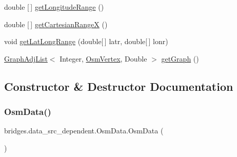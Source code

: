 \begin{DoxyCompactItemize}
double \mbox{[}$\,$\mbox{]} \hyperlink{classbridges_1_1data__src__dependent_1_1_osm_data_a4a30fc62901cd0cea50d2e4a266c6c05}{get\+Longitude\+Range} ()
\item 
double \mbox{[}$\,$\mbox{]} \hyperlink{classbridges_1_1data__src__dependent_1_1_osm_data_aa8a436daa0df5d64bc24f45b371872c5}{get\+Cartesian\+RangeX} ()
\item 
void \hyperlink{classbridges_1_1data__src__dependent_1_1_osm_data_a2f80de5c73dd1bf72378e6a0573ba663}{get\+Lat\+Long\+Range} (double\mbox{[}$\,$\mbox{]} latr, double\mbox{[}$\,$\mbox{]} lonr)
\item 
\hyperlink{classbridges_1_1base_1_1_graph_adj_list}{Graph\+Adj\+List}$<$ Integer, \hyperlink{classbridges_1_1data__src__dependent_1_1_osm_vertex}{Osm\+Vertex}, Double $>$ \hyperlink{classbridges_1_1data__src__dependent_1_1_osm_data_a4f5282b7b11ef6e4a248a05c35fe3787}{get\+Graph} ()
\end{DoxyCompactItemize}


\subsection{Constructor \& Destructor Documentation}
\mbox{\label{classbridges_1_1data__src__dependent_1_1_osm_data_a1ba678dfedee33772a620d678f7a04d8}} 
\subsubsection{\texorpdfstring{Osm\+Data()}{OsmData()}\hspace{0.1cm}{\footnotesize\ttfamily [1/2]}}
{\footnotesize\ttfamily bridges.\+data\+\_\+src\+\_\+dependent.\+Osm\+Data.\+Osm\+Data (\begin{DoxyParamCaption}{ }\end{DoxyParamCaption})}

\mbox{\label{classbridges_1_1data__src__dependent_1_1_osm_data_a822667d3269b059bf14e80c36b12fbb9}} 
